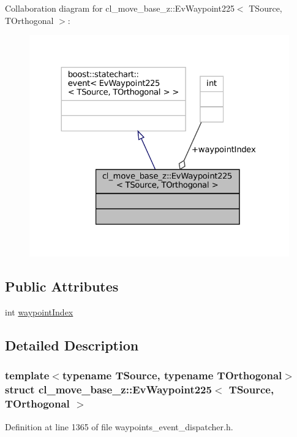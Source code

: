 Collaboration diagram for cl\+\_\+move\+\_\+base\+\_\+z\+:\+:Ev\+Waypoint225$<$ T\+Source, T\+Orthogonal $>$\+:
\nopagebreak
\begin{figure}[H]
\begin{center}
\leavevmode
\includegraphics[width=324pt]{structcl__move__base__z_1_1EvWaypoint225__coll__graph}
\end{center}
\end{figure}
\subsection*{Public Attributes}
\begin{DoxyCompactItemize}
\item 
int \hyperlink{structcl__move__base__z_1_1EvWaypoint225_a0770eb0d7a9156e6aa75406eb56d97b4}{waypoint\+Index}
\end{DoxyCompactItemize}


\subsection{Detailed Description}
\subsubsection*{template$<$typename T\+Source, typename T\+Orthogonal$>$\newline
struct cl\+\_\+move\+\_\+base\+\_\+z\+::\+Ev\+Waypoint225$<$ T\+Source, T\+Orthogonal $>$}



Definition at line 1365 of file waypoints\+\_\+event\+\_\+dispatcher.\+h.



